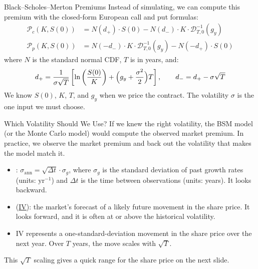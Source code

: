 \documentclass[aspectratio=169,11pt]{beamer}
\newcommand{\Pc}{\mathcal{P}_{c}(K,S(0))}
\newcommand{\Pp}{\mathcal{P}_{p}(K,S(0))}
\newcommand{\Dinv}{\mathcal{D}^{-1}_{T,0}(g_{y})}
\begin{document}
\begin{frame}{Black–Scholes–Merton Premiums}
  Instead of simulating, we can compute this premium with the closed-form
  European call and put formulas:
  \begin{equation*}
    \boxed{
    \begin{aligned}
      \Pc & = N(d_{+})\cdot S(0)-N(d_{-})\cdot K\cdot\Dinv\\
      \Pp & = N(-d_{-})\cdot K\cdot\Dinv-N(-d_{+})\cdot S(0)
    \end{aligned}}
  \end{equation*}
  where $N$ is the standard normal CDF, $T$ is in years, and:
  \[
    d_{+}=\frac{1}{\sigma\sqrt{T}}\left[\ln\left(\frac{S(0)}{K}\right)+\Bigl(g_{y}+\frac{\sigma^{2}}{2}\Bigr)T\right],
    \qquad d_{-}=d_{+}-\sigma\sqrt{T}
  \]
  We know $S(0)$, $K$, $T$, and $g_{y}$ when we price the contract. The
  volatility $\sigma$ is the one input we must choose.
\end{frame}

\begin{frame}{Which Volatility Should We Use?}
  If we knew the right volatility, the BSM model (or the Monte Carlo model)
  would compute the observed market premium. In practice, we observe the market
  premium and back out the volatility that makes the model match it.
  \begin{itemize}\setlength{\itemsep}{0.6em}
    \item {}:
      $\sigma_{\mathrm{ann}}=\sqrt{\Delta t}\cdot\sigma_{g}$, where $\sigma_{g}$
      is the standard deviation of past growth rates (units: $\mathrm{yr}^{-1}$)
      and $\Delta t$ is the time between observations (units: years). It looks
      backward.
    \item {}
      (\href{https://en.wikipedia.org/wiki/Implied_volatility}{IV}): the
      market's forecast of a likely future movement in the share price. It looks
      forward, and it is often at or above the historical volatility.
    \item {} IV represents a one-standard-deviation
      movement in the share price over the next year. Over $T$ years, the move
      scales with $\sqrt{T}$.
  \end{itemize}
  \vspace{0.3em}
  This $\sqrt{T}$ scaling gives a quick range for the share price on the next
  slide.
\end{frame}
\end{document}
